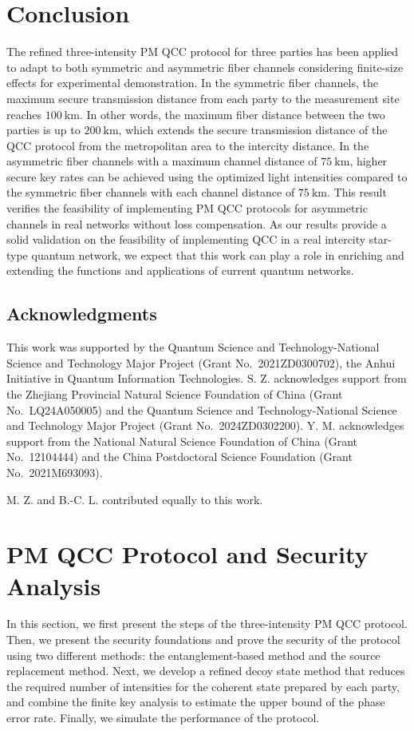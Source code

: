 \documentclass[aps,twocolumn,superscriptaddress,showpacs,nofootinbib]{revtex4-2}
\begin{document}
\section{Conclusion}
The refined three-intensity PM QCC protocol for three parties has been applied to adapt to both symmetric and asymmetric fiber channels considering finite-size effects for experimental demonstration. In the symmetric fiber channels, the maximum secure transmission distance from each party to the measurement site reaches $\SI{100}{\km}$. In other words, the maximum fiber distance between the two parties is up to $\SI{200}{\km}$, which extends the secure transmission distance of the QCC protocol from the metropolitan area to the intercity distance. In the asymmetric fiber channels with a maximum channel distance of $\SI{75}{\km}$, higher secure key rates can be achieved using the optimized light intensities compared to the symmetric fiber channels with each channel distance of $\SI{75}{\km}$. This result verifies the feasibility of implementing PM QCC protocols for asymmetric channels in real networks without loss compensation. As our results provide a solid validation on the feasibility of implementing QCC in a real intercity star-type quantum network, we expect that this work can play a role in enriching and extending the functions and applications of current quantum networks.

\begin{acknowledgments}
\section{Acknowledgments}
This work was supported by the Quantum Science and Technology-National Science and Technology Major Project (Grant No.~2021ZD0300702), the Anhui Initiative in Quantum Information Technologies. S. Z. acknowledges support from the Zhejiang Provincial Natural Science Foundation of China (Grant No.~LQ24A050005) and the Quantum Science and Technology-National Science and Technology Major Project (Grant No.~2024ZD0302200). Y. M. acknowledges support from the National Natural Science Foundation of China (Grant No.~12104444) and the China Postdoctoral Science Foundation (Grant No.~2021M693093).

M. Z. and B.-C. L. contributed equally to this work.
\end{acknowledgments}

\appendix


\section{PM QCC Protocol and Security Analysis} \label{sec:sa}
In this section, we first present the steps of the three-intensity PM QCC protocol. Then, we present the security foundations and prove the security of the protocol using two different methods: the entanglement-based method and the source replacement method. Next, we develop a refined decoy state method that reduces the required number of intensities for the coherent state prepared by each party, and combine the finite key analysis to estimate the upper bound of the phase error rate. Finally, we simulate the performance of the protocol.
\end{document}
